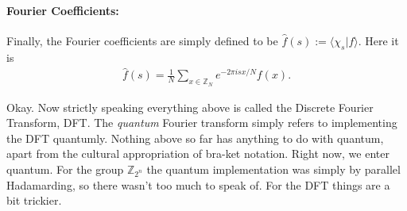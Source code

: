 \paragraph{Fourier Coefficients:} Finally, the Fourier coefficients are simply defined to be $\hat{f}(s) := \langle \chi_s|f\rangle$. Here it is 
\begin{align*}
    \hat{f}(s) = \frac{1}{N} \sum_{x \in \mathbb{Z}_N} e^{-2\pi i sx/N} f(x).
\end{align*}

Okay. Now strictly speaking everything above is called the Discrete Fourier Transform, DFT. The \textit{quantum} Fourier transform simply refers to implementing the DFT quantumly. Nothing above so far has anything to do with quantum, apart from the cultural appropriation of bra-ket notation. Right now, we enter quantum. For the group $\mathbb{Z}_{2^n}$ the quantum implementation was simply by parallel Hadamarding, so there wasn't too much to speak of. For the DFT things are a bit trickier.

